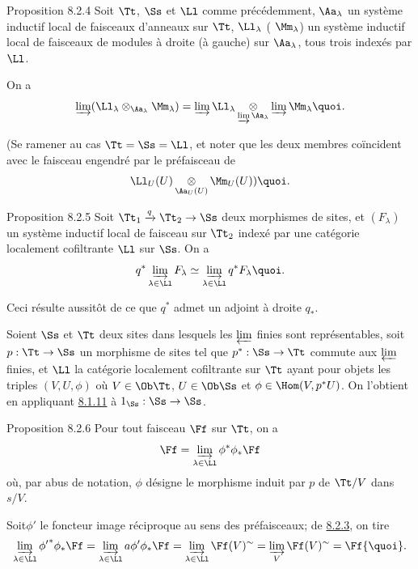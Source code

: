 \begin{enonce*}{Proposition 8.2.4}
Soit $\Tt$, $\Ss$ et $\Ll$ comme précédemment,
$\Aa_{\lambda}$ un système inductif local de faisceaux
d'anneaux sur $\Tt$, $\Ll_{\lambda}$ (\resp
$\Mm_{\lambda}$) un système inductif local de faisceaux de
modules à droite (\resp à gauche) sur $\Aa_{\lambda}$, tous
trois indexés par $\Ll$.

On a
$$
\varinjlim (\Ll_{\lambda}
\otimes_{\Aa_{\lambda}} \Mm_{\lambda}) =
\varinjlim \Ll_{\lambda} \mathop{\otimes}_{\varinjlim
    \Aa_{\lambda}} \varinjlim \Mm_{\lambda}{\quoi}.
$$
\end{enonce*}

(Se ramener au cas $\Tt = \Ss = \Ll$, et noter que les
deux membres coïncident avec le faisceau engendré par le préfaisceau
de
$$
\Ll_U (U) \mathop{\otimes}_{\Aa_{U} (U)} \Mm_U (U) ){\quoi}.
$$

\begin{enonce*}{Proposition 8.2.5}
Soit $\Tt_1 \xrightarrow{q} \Tt_2 \to \Ss$ deux morphismes de sites,
et $(F_{\lambda})$ un système inductif local de faisceau sur $\Tt_2$
indexé par une catégorie localement cofiltrante $\Ll$ sur $\Ss$. On
a
$$
q^{\ast} \varinjlim_{\lambda \in \Ll} F_{\lambda} \simeq
\varinjlim_{\lambda \in \Ll} q^{\ast} F_{\lambda} {\quoi}.
$$
\end{enonce*}

Ceci résulte aussitôt de ce que $q^{\ast}$ admet un adjoint à droite $q_{\ast}$.

Soient $\Ss$ et $\Tt$ deux sites dans lesquels les
$\varprojlim$ finies sont représentables, soit
$p:\Tt\to\Ss$ un morphisme de sites tel que $p^{\ast}:\Ss\to\Tt$
commute aux $\varprojlim$ finies, et $\Ll$
la catégorie localement cofiltrante sur $\Tt$ ayant pour
objets les triples $(V, U, \phi)$ où $V \in \Ob \Tt$, $U \in
\Ob \Ss$ et $\phi \in \Hom (V, p^{\ast} U)$. On l'obtient en appliquant \hyperref[V.lem8.1.11]{8.1.11}
à $1_{\Ss} : \Ss \to \Ss$.

\begin{enonce*}{Proposition 8.2.6}
Pour tout faisceau $\Ff$ sur $\Tt$, on a
$$
\Ff = \varinjlim_{\lambda \in \Ll} \phi^{\ast}
\phi_{\ast} \Ff
$$
où, par abus de notation, $\phi$ désigne le morphisme induit par $p$
de $\Tt/V$ dans $s/V$.
\end{enonce*}

Soit\pageoriginale $\phi'$ le foncteur image réciproque au sens des préfaisceaux;
de \hyperref[V.lem8.2.3]{8.2.3}, on tire
$$
\varinjlim_{\lambda \in \Ll} {\phi'}^{\ast} \phi_{\ast}
\Ff = \varinjlim_{\lambda \in \Ll} a {\phi}'
\phi_{\ast} \Ff = \varinjlim_{\lambda \in \Ll}
\Ff (V)^{\sim} = \varinjlim_{V} \Ff (V)^{\sim}
= \Ff{\quoi}.
$$

